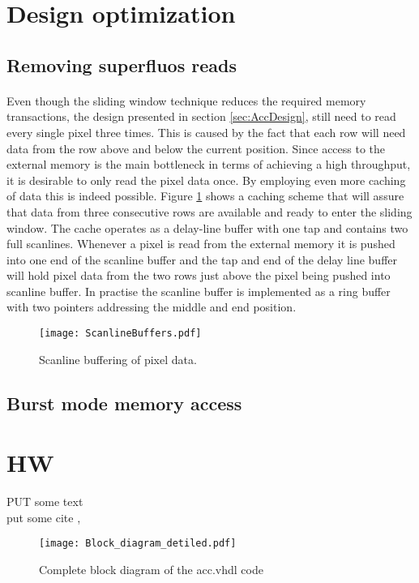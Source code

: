 \section{Design optimization}
\label{sec:Optimization}
\subsection*{Removing superfluos reads}
\label{sec:memaccess}
\paragraph*{}
Even though the sliding window technique reduces the required memory transactions, the design presented in section \ref{sec:AccDesign}, still need to read every single pixel three times. This is caused by the fact that each row will need data from the row above and below the current position. Since access to the external memory is the main bottleneck in terms of achieving a high throughput, it is desirable to only read the pixel data once. By employing even more caching of data this is indeed possible. Figure \ref{fig:ScanlineBuffers} shows a caching scheme that will assure that data from three consecutive rows are available and ready to enter the sliding window. The cache operates as a delay-line buffer with one tap and contains two full scanlines. Whenever a pixel is read from the external memory it is pushed into one end of the scanline buffer and the tap and end of the delay line buffer will hold pixel data from the two rows just above the pixel being pushed into  scanline buffer. In practise the scanline buffer is implemented as a ring buffer with two pointers addressing the middle and end position.

\begin{figure}[H]
	\centering
	\texttt{[image: ScanlineBuffers.pdf]}
	\caption{Scanline buffering of pixel data.}
	\label{fig:ScanlineBuffers}
\end{figure}

\subsection*{Burst mode memory access}
\label{sec:memaccess}
\paragraph*{}


\section{HW}
\label{sec:hw}
PUT some text\\
put some cite \cite[p.11~eq.2.6]{Book}, \cite[p.11~eq.2.6]{Note}

\begin{figure}[H]
	\centering
	\texttt{[image: Block\_diagram\_detiled.pdf]}
	\caption{Complete block diagram of the acc.vhdl code}
	\label{fig:block_acc}
\end{figure}